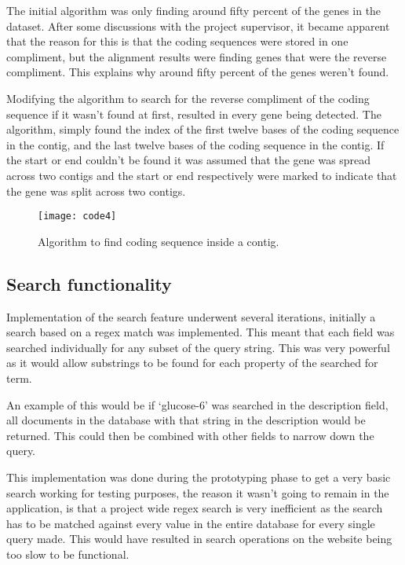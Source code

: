 The initial algorithm was only finding around fifty percent of the genes in the dataset. After some discussions with the project supervisor, it became apparent that the reason for this is that the coding sequences were stored in one compliment, but the alignment results were finding genes that were the reverse compliment. This explains why around fifty percent of the genes weren't found. 

Modifying the algorithm to search for the reverse compliment of the coding sequence if it wasn't found at first, resulted in every gene being detected. The algorithm, simply found the index of the first twelve bases of the coding sequence in the contig, and the last twelve bases of the coding sequence in the contig. If the start or end couldn't be found it was assumed that the gene was spread across two contigs and the start or end respectively were marked to indicate that the gene was split across two contigs. 

\begin{figure}[H]
\begin{center}
\texttt{[image: code4]}
\caption{Algorithm to find coding sequence inside a contig. \label{overflow}}
\end{center}
\end{figure}

\subsection{Search functionality}
Implementation of the search feature underwent several iterations, initially a search based on a regex match was implemented. This meant that each field was searched individually for any subset of the query string. This was very powerful as it would allow substrings to be found for each property of the searched for term. 

An example of this would be if `glucose-6' was searched in the description field, all documents in the database with that string in the description would be returned. This could then be combined with other fields to narrow down the query. 

This implementation was done during the prototyping phase to get a very basic search working for testing purposes, the reason it wasn't going to remain in the application, is that a project wide regex search is very inefficient as the search has to be matched against every value in the entire database for every single query made. This would have resulted in search operations on the website being too slow to be functional.


